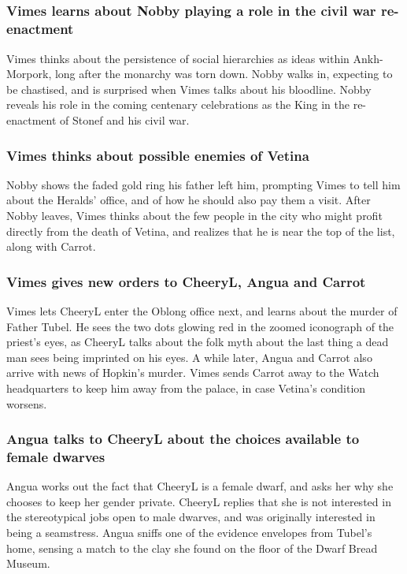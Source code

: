 \subsection{}
\subsubsection{\Gls{Vimes} learns about \Gls{Nobby} playing a role in the civil war re-enactment}
\Gls{Vimes} thinks about the persistence of social hierarchies as ideas within Ankh-Morpork, long
after the monarchy was torn down. \Gls{Nobby} walks in, expecting to be chastised, and is
surprised when \Gls{Vimes} talks about his bloodline. \Gls{Nobby} reveals his role in the coming
centenary celebrations as the King in the re-enactment of \Gls{Stonef} and his civil war.

\subsubsection{\Gls{Vimes} thinks about possible enemies of \Gls{Vetina}}
\Gls{Nobby} shows the faded gold ring his father left him, prompting \Gls{Vimes} to tell him about
the Heralds' office, and of how he should also pay them a visit. After \Gls{Nobby} leaves,
\Gls{Vimes} thinks about the few people in the city who might profit directly from the death of
\Gls{Vetina}, and realizes that he is near the top of the list, along with \Gls{Carrot}.

\subsubsection{\Gls{Vimes} gives new orders to \Gls{CheeryL}, \Gls{Angua} and \Gls{Carrot}}
\Gls{Vimes} lets \Gls{CheeryL} enter the Oblong office next, and learns about the murder of
Father \Gls{Tubel}. He sees the two dots glowing red in the zoomed iconograph of the priest's eyes,
as \Gls{CheeryL} talks about the folk myth about the last thing a dead man sees being imprinted
on his eyes. A while later, \Gls{Angua} and \Gls{Carrot} also arrive with news of \Gls{Hopkin}'s
murder. \Gls{Vimes} sends \Gls{Carrot} away to the Watch headquarters to keep him away from the
palace, in case \Gls{Vetina}'s condition worsens.

\subsubsection{\Gls{Angua} talks to \Gls{CheeryL} about the choices available to female dwarves}
\Gls{Angua} works out the fact that \Gls{CheeryL} is a female dwarf, and asks her why she chooses to
keep her gender private. \Gls{CheeryL} replies that she is not interested in the stereotypical
jobs open to male dwarves, and was originally interested in being a seamstress. \Gls{Angua} sniffs
one of the evidence envelopes from \Gls{Tubel}'s home, sensing a match to the clay she found on
the floor of the Dwarf Bread Museum.

